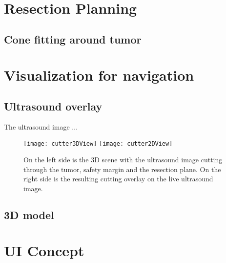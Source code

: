 \section{Resection Planning}
\subsection{Cone fitting around tumor}
\section{Visualization for navigation}
\subsection{Ultrasound overlay}
The ultrasound image ...
\begin{figure}[H]
  \centering
  \texttt{[image: cutter3DView]} 
  \endminipage
  \hfill
  \texttt{[image: cutter2DView]}
  \endminipage
  \hfill 
 \caption{On the left side is the 3D scene with the ultrasound image cutting
   through the tumor, safety margin and the resection plane. On the right side
   is the resulting cutting overlay on the live ultrasound image.}
  \label{fig:cutterExample}
\end{figure}
\subsection{3D model}
\section{UI Concept}
